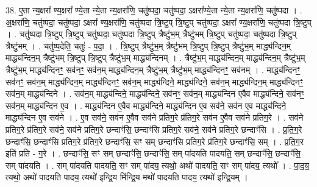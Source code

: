 \documentclass[17pt]{extarticle}
\begin{document}
38. ए॒ता न्य॒क्षरा᳚ ण्य॒क्षरा᳚ ण्ये॒ता न्ये॒ता न्य॒क्षरा॑णि॒ चतु॑ष्पदा॒ चतु॑ष्पदा॒ ऽक्षरा᳚ण्ये॒ता न्ये॒ता न्य॒क्षरा॑णि॒ चतु॑ष्पदा । . अ॒क्षरा॑णि॒ चतु॑ष्पदा॒ चतु॑ष्पदा॒ ऽक्षरा᳚ ण्य॒क्षरा॑णि॒ चतु॑ष्पदा त्रि॒ष्टुप् त्रि॒ष्टुप् 
चतु॑ष्पदा॒ ऽक्षरा᳚ ण्य॒क्षरा॑णि॒ चतु॑ष्पदा त्रि॒ष्टुप् । . चतु॑ष्पदा त्रि॒ष्टुप् त्रि॒ष्टुप् चतु॑ष्पदा॒ चतु॑ष्पदा त्रि॒ष्टुप् त्रैष्टु॑भ॒म् त्रैष्टु॑भम् त्रि॒ष्टुप् चतु॑ष्पदा॒ चतु॑ष्पदा त्रि॒ष्टुप् त्रैष्टु॑भम् । . चतु॑ष्प॒देति॒ चतुः॑ - प॒दा॒ । . त्रि॒ष्टुप् त्रैष्टु॑भ॒म् त्रैष्टु॑भम् त्रि॒ष्टुप् त्रि॒ष्टुप् त्रैष्टु॑भ॒म् माद्ध्य॑न्दिन॒म् माद्ध्य॑न्दिन॒म् त्रैष्टु॑भम् त्रि॒ष्टुप् त्रि॒ष्टुप् त्रैष्टु॑भ॒म् माद्ध्य॑न्दिनम् । . त्रैष्टु॑भ॒म् माद्ध्य॑न्दिन॒म् माद्ध्य॑न्दिन॒म् त्रैष्टु॑भ॒म् त्रैष्टु॑भ॒म् माद्ध्य॑न्दिनꣳ॒॒ सव॑नꣳ॒॒ सव॑न॒म् माद्ध्य॑न्दिन॒म् त्रैष्टु॑भ॒म् त्रैष्टु॑भ॒म् माद्ध्य॑न्दिनꣳ॒॒ सव॑नम् । . माद्ध्य॑न्दिनꣳ॒॒ सव॑नꣳ॒॒ सव॑न॒म् माद्ध्य॑न्दिन॒म् माद्ध्य॑न्दिनꣳ॒॒ सव॑न॒म् माद्ध्य॑न्दिने॒ माद्ध्य॑न्दिने॒ सव॑न॒म् माद्ध्य॑न्दिन॒म् माद्ध्य॑न्दिनꣳ॒॒ सव॑न॒म् माद्ध्य॑न्दिने । . सव॑न॒म् माद्ध्य॑न्दिने॒ माद्ध्य॑न्दिने॒ सव॑नꣳ॒॒ सव॑न॒म् माद्ध्य॑न्दिन ए॒वैव माद्ध्य॑न्दिने॒ सव॑नꣳ॒॒ सव॑न॒म् माद्ध्य॑न्दिन ए॒व । . माद्ध्य॑न्दिन ए॒वैव माद्ध्य॑न्दिने॒ माद्ध्य॑न्दिन ए॒व सव॑ने॒ सव॑न ए॒व माद्ध्य॑न्दिने॒ माद्ध्य॑न्दिन ए॒व सव॑ने । . ए॒व सव॑ने॒ सव॑न ए॒वैव सव॑ने प्रतिग॒रे प्र॑तिग॒रे सव॑न ए॒वैव सव॑ने प्रतिग॒रे । . सव॑ने प्रतिग॒रे प्र॑तिग॒रे सव॑ने॒ सव॑ने प्रतिग॒रे छन्दाꣳ॑सि॒ छन्दाꣳ॑सि प्रतिग॒रे सव॑ने॒ सव॑ने प्रतिग॒रे छन्दाꣳ॑सि । . प्र॒ति॒ग॒रे छन्दाꣳ॑सि॒ छन्दाꣳ॑सि प्रतिग॒रे प्र॑तिग॒रे छन्दाꣳ॑सि॒ सꣳ सम् छन्दाꣳ॑सि प्रतिग॒रे प्र॑तिग॒रे छन्दाꣳ॑सि॒ सम् । . प्र॒ति॒ग॒र इति॑ प्रति - ग॒रे । . छन्दाꣳ॑सि॒ सꣳ सम् छन्दाꣳ॑सि॒ छन्दाꣳ॑सि॒ सम् पा॑दयति पादयति॒ सम् छन्दाꣳ॑सि॒ छन्दाꣳ॑सि॒ सम् पा॑दयति । . सम् पा॑दयति पादयति॒ सꣳ सम् पा॑दय॒ त्यथो॒ अथो॑ पादयति॒ सꣳ सम् पा॑दय॒ त्यथो᳚ । . पा॒द॒य॒ त्यथो॒ अथो॑ पादयति पादय॒ त्यथो॑ इन्द्रि॒य मि॑न्द्रि॒य मथो॑ पादयति पादय॒ त्यथो॑ इन्द्रि॒यम् । \newline
\end{document}
